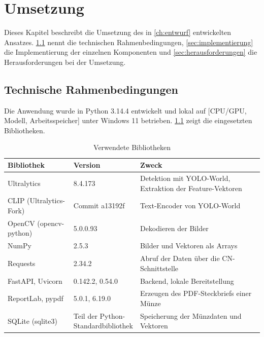 
\chapter{Umsetzung}\label{ch:umsetzung}
\glsresetall %
Dieses Kapitel beschreibt die Umsetzung des in \cref{ch:entwurf} entwickelten Ansatzes. \cref{sec:rahmenbedingungen} nennt die technischen Rahmenbedingungen, \cref{sec:implementierung} die Implementierung der einzelnen Komponenten und \cref{sec:herausforderungen} die Herausforderungen bei der Umsetzung.

\section{Technische Rahmenbedingungen}
\label{sec:rahmenbedingungen}
Die Anwendung wurde in Python 3.14.4 entwickelt und lokal auf [CPU/GPU, Modell, Arbeitsspeicher]  unter Windows 11 betrieben. \cref{tab:bibliotheken} zeigt die eingesetzten Bibliotheken.

\begin{table}[H]
    \centering
    \small
    \begin{tabularx}{\textwidth}{|l|l|X|}
        \hline
        \textbf{Bibliothek} & \textbf{Version} & \textbf{Zweck} \\
        \hline
        Ultralytics & 8.4.173 & Detektion mit YOLO-World, Extraktion der Feature-Vektoren \\
        \hline
        CLIP (Ultralytics-Fork) & Commit a13192f & Text-Encoder von YOLO-World \\ \hline
        OpenCV (opencv-python) & 5.0.0.93 & Dekodieren der Bilder \\
        \hline
        NumPy & 2.5.3 & Bilder und Vektoren als Arrays \\ \hline
        Requests & 2.34.2 & Abruf der Daten über die CN-Schnittstelle \\
        \hline
        FastAPI, Uvicorn & 0.142.2, 0.54.0 & Backend, lokale Bereitstellung \\
        \hline
        ReportLab, pypdf & 5.0.1, 6.19.0 & Erzeugen des PDF-Steckbriefs einer Münze \\ \hline
        SQLite (sqlite3) & \makecell[l]{Teil der Python-\\Standardbibliothek} & Speicherung der Münzdaten und Vektoren \\
        \hline
    \end{tabularx}
    \caption{Verwendete Bibliotheken}
    \label{tab:bibliotheken}
\end{table}

